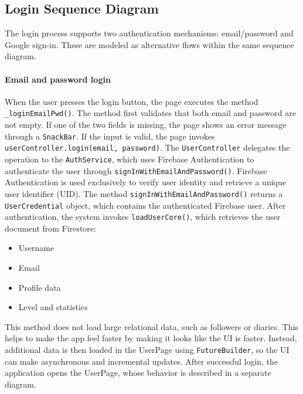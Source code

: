 \newpage
\subsection{Login Sequence Diagram}

The login process supports two authentication mechanisms: email/password and Google sign-in. These are modeled as alternative flows within the same sequence diagram.
\paragraph{Email and password login}
When the user presses the login button, the page executes the method \texttt{\_loginEmailPwd()}. The method first validates that both email and password are not empty. If one of the two fields is missing, the page shows an error message through a \texttt{SnackBar}.
If the input is valid, the page invokes \texttt{userController.login(email, password)}. The \texttt{UserController} delegates the operation to the \texttt{AuthService}, which uses Firebase Authentication to authenticate the user through \texttt{signInWithEmailAndPassword()}.
Firebase Authentication is used exclusively to verify user identity and retrieve a unique user identifier (UID). The method \texttt{signInWithEmailAndPassword()} returns a \texttt{UserCredential} object, which contains the authenticated Firebase user. 
After authentication, the system invokes \texttt{loadUserCore()}, which retrieves the user document from Firestore:

\begin{itemize}
\item Username
\item Email
\item Profile data
\item Level and statistics
\end{itemize}

This method does not load large relational data, such as followers or diaries. This helps to make the app feel faster by making it looks like the UI is faster.
Instead, additional data is then loaded in the UserPage using \texttt{FutureBuilder}, so the UI can make asynchronous and incremental updates.
After successful login, the application opens the UserPage, whose behavior is described in a separate diagram.

